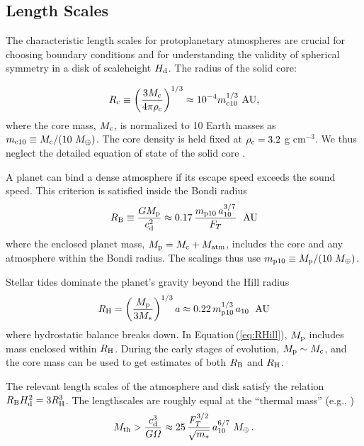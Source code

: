 \documentclass[apj, numberedappendix]{emulateapj}
\newcommand{\AU}{\; {\rm AU}}
\newcommand{\Eq}[1]{Equation\,(\ref{#1})}
\newcommand{\RB}{R_{\rm B}}
\newcommand{\RH}{R_{\rm H}}
\newcommand{\co}{_{\rm c}}
\newcommand{\pla}{_{\rm p}}
\newcommand{\di}{_{\rm d}}
\newcommand{\mcn}[1] { m_{ \rm c #1} }
\newcommand{\mpn}[1] { m_{ \rm p #1} }
\newcommand{\aun}[1]{ a_{#1} }
\begin{document}
\subsection{Length Scales}
\label{sec:scales}

The characteristic length scales for protoplanetary atmospheres are crucial for choosing boundary conditions and for understanding the validity of  spherical symmetry in a disk of scaleheight $H\di$.  The radius of the solid core:

\begin{equation}
\label{eq:rc}
R\co \equiv \left(\frac{3 M\co}{4 \pi \rho\co}\right)^{1/3} \approx 10^{-4} \mcn{10}^{1/3} ~\text{AU},
\end{equation}
where the core mass, $M\co$, is normalized to 10 Earth masses as $\mcn{10} \equiv M\co/(10~M_\oplus)$. The core density is held fixed at $\rho\co=3.2$ g cm$^{-3}$.  We thus neglect  the detailed equation of state of the solid core \citep{fortney07}.

A planet can bind a dense atmosphere if its escape speed exceeds the sound speed.  This criterion is satisfied inside the Bondi radius
\begin{equation}
\label{eq:RB}
\RB \equiv \frac{G M\pla}{c\di^2} \approx 0.17 \, {\mpn{10}  \, \aun{10}^{3/7} \over F_T} ~\AU
\end{equation}
where the enclosed planet mass, $M\pla = M\co + M_\mathrm{atm}$, includes the core and any atmosphere within the Bondi radius.  The scalings thus use $\mpn{10} \equiv M\pla /(10~M_\oplus)$.   

Stellar tides dominate the planet's gravity beyond the Hill radius
\begin{equation}
\label{eq:RHill}
R_{\rm H} = \left(M\pla \over 3 M_\ast \right)^{1/3}a \approx 0.22 \, {\mpn{10}^{1/3} \, \aun{10} }~\AU
\end{equation}
where hydrostatic balance breaks down.  In \Eq{eq:RHill}, $M\pla$ includes mass enclosed within $\RH$.  During the early stages of evolution, $M\pla \sim M\co$, and the core mass can be used to get estimates of both $\RB$ and $\RH$. 

The relevant length scales of the atmosphere and disk satisfy the relation $\RB H\di^2 = 3 R_{\rm H}^3$.  The lengthscales are roughly equal at the ``thermal mass'' (e.g., \citealt{menou04})
\begin{equation}
M_{\rm th} > {c\di^{3} \over G \varOmega} \approx 25 \, {F_T^{3/2} \over \sqrt{m_\ast} } \, \aun{10}^{6/7}~ M_\oplus \, .
\end{equation} 
\end{document}
